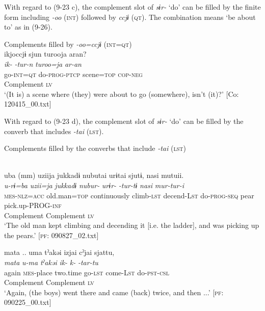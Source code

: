 With regard to (9-23 c), the complement slot of \textit{sɨr-} ‘do’ can be filled by the finite form including \textit{{}-oo} (\textsc{int}) followed by \textit{ccjɨ} (\textsc{qt}). The combination means ‘be about to’ as in (9-26).

\ea   Complements filled by \textit{{}-oo=ccjɨ} (\textsc{int}=\textsc{qt}) \label{ex:9.26}\\
 \gllll  ikjoccjɨ  sjun  turooja  aran?\\
    \textit{ik-}  \textit{-tur-n}  \textit{turoo=ja}  \textit{ar-an}\\
    go-\textsc{int}=\textsc{qt}  do-\textsc{prog}-\textsc{ptcp}  scene=\textsc{top}  \textsc{cop}-\textsc{neg}\\
    Complement  \textsc{lv}\\
    \glt     ‘(It is) a scene where (they) were about to go (somewhere), isn’t (it)?’ [Co: 120415\_00.txt]
\z

  With regard to (9-23 d), the complement slot of \textit{sɨr-} ‘do’ can be filled by the converb that includes \textit{{}-tai} (\textsc{lst}).

\ea   Complements filled by the converbs that include \textit{{}-tai} (\textsc{lst}) \label{ex:9.27}

  \ea \label{ex:9.27a}\relax [= (8-93 b)]\\
    \gllll  uba  (mm)  uziija  jukkadɨ  nubutai  urɨtai  sjutɨ,  nasi  mutuii.\\
      \textit{u-rɨ=ba}  {}  \textit{uzii=ja}  \textit{jukkadɨ}  \textit{nubur-} \textit{urɨr-}  \textit{-tur-tɨ}  \textit{nasi}  \textit{mur-tur-i}\\
      \textsc{mes}-\textsc{nlz}=\textsc{acc}  {}  old.man=\textsc{top}  continuously  climb-\textsc{lst}  decend-L\textsc{st}  do-\textsc{prog}-\textsc{seq}  pear  pick.up-PROG-\textsc{inf}\\
       {} {}  {} {}   Complement     Complement  \textsc{lv}    \\
      \glt       ‘The old man kept climbing and decending it [i.e. the ladder], and was picking up the pears.’ [\textsc{pf}: 090827\_02.txt]

\ex \label{ex:9.27b} %
    \gllll  mata  ..  uma  tˀakəi  izjai  cˀjai  sjattu,\\
      \textit{mata} {}   \textit{u-ma}  \textit{tˀakəi}  \textit{ik-}  \textit{k-}  \textit{-tar-tu}\\
      again  {}  \textsc{mes}-place  two.time  go-\textsc{lst}  come-L\textsc{st}  do-\textsc{pst}-\textsc{csl}\\
        {}  {}  {}   {} Complement  Complement  \textsc{lv}\\
      \glt       ‘Again, (the boys) went there and came (back) twice, and then ...’ [\textsc{pf}: 090225\_00.txt]
    \z
\z

